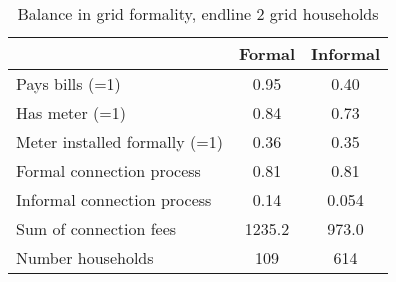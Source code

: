 \begin{table}[htbp]\centering
\def\sym#1{\ifmmode^{#1}\else\(^{#1}\)\fi}
\caption{Balance in grid formality, endline 2 grid households}

\begin{tabular*}{0.9\hsize}{@{\hskip\tabcolsep\extracolsep\fill}l*{1}{cc}}
\toprule
                                &Formal&  Informal \\
\midrule
Pays bills (=1)                 &     0.95&     0.40\\
                                
Has meter (=1)                  &     0.84&     0.73\\
                               
Meter installed formally (=1)   &     0.36&     0.35 \\
                             
Formal connection process       &     0.81&     0.81 \\
                         
Informal connection process     &     0.14&    0.054\\
                                
Sum of connection fees          &   1235.2&    973.0 \\
                                
Number households               &      109&      614 \\
\bottomrule

\end{tabular*}
\end{table}